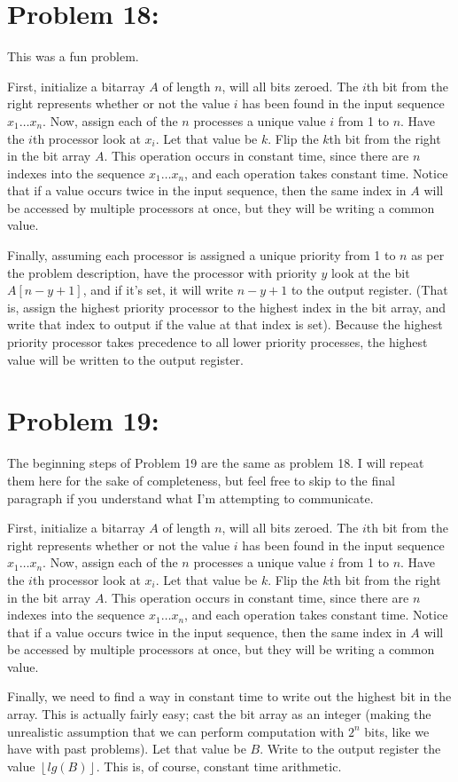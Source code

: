 \documentclass[12pt]{article}
\begin{document}
\section*{Problem 18: }

This was a fun problem.

First, initialize a bitarray $A$ of length $n$, will all bits zeroed. The $i$th bit from the right represents whether or not the value $i$ has been found in the input sequence $x_{1} \dots x_{n}$. Now, assign each of the $n$ processes a unique value $i$ from 1 to $n$. Have the $i$th processor look at $x_{i}$. Let that value be $k$. Flip the $k$th bit from the right in the bit array $A$. This operation occurs in constant time, since there are $n$ indexes into the sequence $x_{1} \dots x_{n}$, and each operation takes constant time. Notice that if a value occurs twice in the input sequence, then the same index in $A$ will be accessed by multiple processors at once, but they will be writing a common value.

Finally, assuming each processor is assigned a unique priority from 1 to $n$ as per the problem description, have the processor with priority $y$ look at the bit $A[n - y + 1]$, and if it's set, it will write $n - y + 1$ to the output register. (That is, assign the highest priority processor to the highest index in the bit array, and write that index to output if the value at that index is set). Because the highest priority processor takes precedence to all lower priority processes, the highest value will be written to the output register.

\section*{Problem 19: }

The beginning steps of Problem 19 are the same as problem 18. I will repeat them here for the sake of completeness, but feel free to skip to the final paragraph if you understand what I'm attempting to communicate.

First, initialize a bitarray $A$ of length $n$, will all bits zeroed. The $i$th bit from the right represents whether or not the value $i$ has been found in the input sequence $x_{1} \dots x_{n}$. Now, assign each of the $n$ processes a unique value $i$ from 1 to $n$. Have the $i$th processor look at $x_{i}$. Let that value be $k$. Flip the $k$th bit from the right in the bit array $A$. This operation occurs in constant time, since there are $n$ indexes into the sequence $x_{1} \dots x_{n}$, and each operation takes constant time. Notice that if a value occurs twice in the input sequence, then the same index in $A$ will be accessed by multiple processors at once, but they will be writing a common value.

Finally, we need to find a way in constant time to write out the highest bit in the array. This is actually fairly easy; cast the bit array as an integer (making the unrealistic assumption that we can perform computation with $2^{n}$ bits, like we have with past problems). Let that value be $B$. Write to the output register the value $\left \lfloor lg({B}) \right \rfloor $. This is, of course, constant time arithmetic. 
\end{document}
